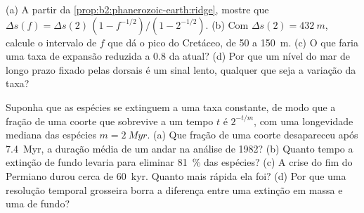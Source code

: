 \begin{exercise}[$\star\star\star$]\label{exo:b2:phanerozoic-earth:11}
(a) A partir da \cref{prop:b2:phanerozoic-earth:ridge}, mostre que $\Delta s(f) = \Delta s(2)\,(1 -
f^{-1/2})/(1 - 2^{-1/2})$. (b) Com $\Delta s(2) = \qty{432}{m}$, calcule o intervalo de $f$ que
dá o pico do Cretáceo, de 50 a \qty{150}{m}. (c) O que faria uma taxa de expansão reduzida a 0.8 da
atual? (d) Por que um nível do mar de longo prazo fixado pelas dorsais é um sinal lento, qualquer que seja a variação
da taxa?
\end{exercise}

\begin{exercise}[$\star\star\star$]\label{exo:b2:phanerozoic-earth:12}
Suponha que as espécies se extinguem a uma taxa constante, de modo que a fração de uma coorte que sobrevive a um tempo
$t$ é $2^{-t/m}$, com uma longevidade mediana das espécies $m = \qty{2}{Myr}$. (a) Que fração de uma
coorte desapareceu após \qty{7.4}{Myr}, a duração média de um andar na análise de 1982? (b) Quanto tempo
a extinção de fundo levaria para eliminar \qty{81}{\percent} das espécies? (c) A crise do fim do Permiano
durou cerca de \qty{60}{kyr}. Quanto mais rápida ela foi? (d) Por que uma resolução temporal grosseira
borra a diferença entre uma extinção em massa e uma de fundo?
\end{exercise}


